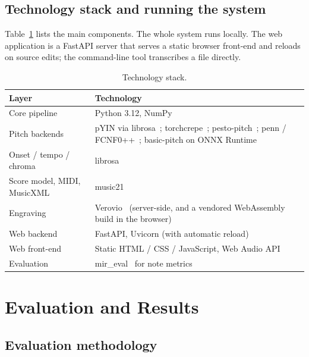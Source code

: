 \documentclass[12pt,a4paper]{article}
\begin{document}
\subsection{Technology stack and running the system}
\label{sec:stack}

Table~\ref{tab:stack} lists the main components. The whole system runs locally.
The web application is a FastAPI server that serves a static browser front-end
and reloads on source edits; the command-line tool transcribes a file directly.

\begin{table}[H]
\centering
\caption{Technology stack.}
\label{tab:stack}
\begin{tabular}{l p{}}
\toprule
\textbf{Layer} & \textbf{Technology} \\
\midrule
Core pipeline     & Python 3.12, NumPy \\
Pitch backends    & pYIN via librosa~\cite{librosa}; torchcrepe~\cite{crepe};
pesto-pitch~\cite{pesto}; penn / FCNF0++~\cite{penn}; basic-pitch on ONNX
Runtime~\cite{basicpitch} \\
Onset / tempo / chroma & librosa~\cite{librosa} \\
Score model, MIDI, MusicXML & music21~\cite{music21} \\
Engraving         & Verovio~\cite{verovio} (server-side, and a vendored
WebAssembly build in the browser) \\
Web backend       & FastAPI, Uvicorn (with automatic reload) \\
Web front-end     & Static HTML / CSS / JavaScript, Web Audio API \\
Evaluation        & mir\_eval~\cite{mireval} for note metrics \\
\bottomrule
\end{tabular}
\end{table}

\section{Evaluation and Results}

\subsection{Evaluation methodology}
\end{document}
